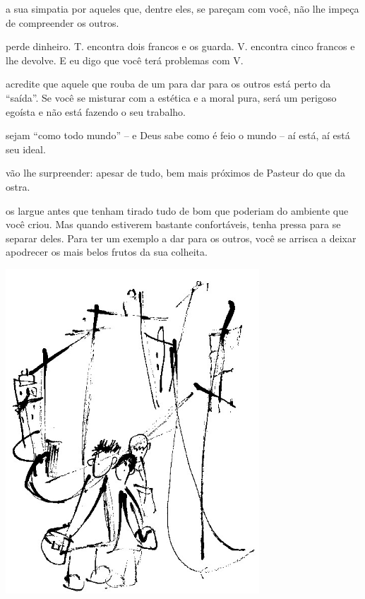  a sua simpatia por aqueles que, dentre eles, se pareçam com você,
não lhe impeça de compreender os outros.

\pagebreak

 perde dinheiro. T. encontra dois francos e os guarda. V. encontra
cinco francos e lhe devolve. E eu digo que você terá problemas com V.



 acredite que aquele que rouba de um para dar para os outros está
perto da ``saída''. Se você se misturar com a estética e a moral pura,
será um perigoso egoísta e não está fazendo o seu trabalho.



 sejam ``como todo mundo'' -- e Deus sabe como é feio o mundo -- aí
está, aí está seu ideal.



 vão lhe surpreender: apesar de tudo, bem mais próximos de Pasteur
do que da ostra.



 os largue antes que tenham tirado tudo de bom que poderiam do
ambiente que você criou. Mas quando estiverem bastante confortáveis,
tenha pressa para se separar deles. Para ter um exemplo a dar para os
outros, você se arrisca a deixar apodrecer os mais belos frutos da sua
colheita.




\pagebreak
\thispagestyle{empty}

\begin{vplace}[.50]
\begin{center}
\includegraphics[width=95mm]{./imgs/Image_12.jpg}
\end{center}
\end{vplace}

